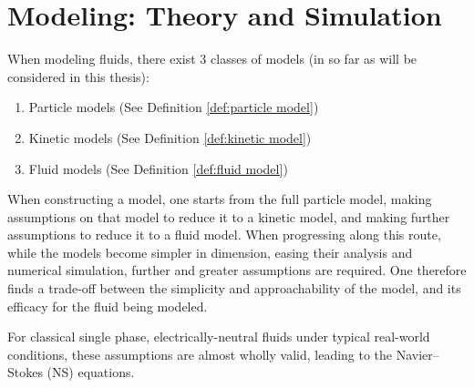 \section{Modeling: Theory and Simulation}
    When modeling fluids, there exist 3 classes of models (in so far as will be considered in this thesis):
    \begin{enumerate}
        \item  Particle models (See Definition \ref{def:particle model})
        \item  Kinetic models (See Definition \ref{def:kinetic model})
        \item  Fluid models (See Definition \ref{def:fluid model})
    \end{enumerate}
    When constructing a model, one starts from the full particle model, making assumptions on that model to reduce it to a kinetic model, and making further assumptions to reduce it to a fluid model. When progressing along this route, while the models become simpler in dimension, easing their analysis and numerical simulation, further and greater assumptions are required. One therefore finds a trade-off between the simplicity and approachability of the model, and its efficacy for the fluid being modeled.
    
    \begin{center}\end{center}

    For classical single phase, electrically-neutral fluids under typical real-world conditions, these assumptions are almost wholly valid, leading to the Navier--Stokes (NS) equations.
    

